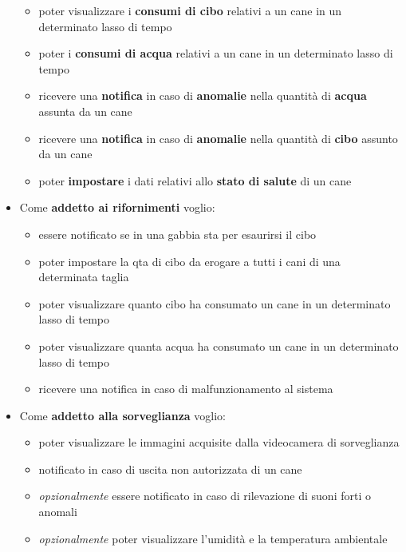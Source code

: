 \begin{itemize}
\begin{itemize}
                    \item poter visualizzare i \textbf{consumi di cibo} relativi a un cane in un determinato lasso di tempo
                    \item poter i \textbf{consumi di acqua} relativi a un cane in un determinato lasso di tempo
                    \item ricevere una \textbf{notifica} in caso di \textbf{anomalie} nella quantità di \textbf{acqua} assunta da un cane
                    \item ricevere una \textbf{notifica} in caso di \textbf{anomalie} nella quantità di \textbf{cibo} assunto da un cane
                    \item poter \textbf{impostare} i dati relativi allo \textbf{stato di salute} di un cane
            \end{itemize}
            
            \item Come \textbf{addetto ai  rifornimenti}
            voglio:
            \begin{itemize}
                \item essere notificato se in una gabbia sta per esaurirsi il cibo
                \item poter impostare la qta di cibo da erogare a tutti i cani di una determinata taglia
                \item poter visualizzare quanto cibo ha consumato un cane in un determinato lasso di tempo
                \item poter visualizzare quanta acqua ha consumato un cane in un determinato lasso di tempo
                \item ricevere una notifica in caso di malfunzionamento al sistema
            \end{itemize}
            \item Come \textbf{addetto alla sorveglianza}
            voglio:
            \begin{itemize}
                \item poter visualizzare le immagini acquisite dalla videocamera di sorveglianza
                \item notificato in caso di uscita non autorizzata di un cane
                \item \textit{opzionalmente} essere notificato in caso di rilevazione di suoni forti o anomali
                \item \textit{opzionalmente} poter visualizzare l’umidità e la temperatura ambientale 
            \end{itemize}
        \end{itemize}
	    
